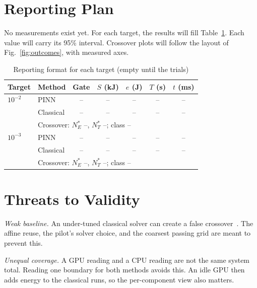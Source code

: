 \documentclass[conference]{IEEEtran}
\newcommand{\Nstar}{N^{\ast}}
\begin{document}
\section{Reporting Plan}\label{sec:report}

No measurements exist yet. For each target, the results will fill Table~\ref{tab:results}. Each value will carry its 95\% interval. Crossover plots will follow the layout of Fig.~\ref{fig:outcomes}, with measured axes.

\begin{table}[t]
\caption{Reporting format for each target (empty until the trials)}
\label{tab:results}
\centering
\footnotesize
\setlength{\tabcolsep}{2.6pt}
\begin{tabular}{@{}llccccc@{}}
\toprule
Target & Method & Gate & $S$ (kJ) & $e$ (J) & $T$ (s) & $t$ (ms) \\
\midrule
$10^{-2}$ & PINN      & -- & -- & -- & -- & -- \\
          & Classical & -- & -- & -- & -- & -- \\
          & \multicolumn{6}{l}{Crossover: $\Nstar_E$ --, $\Nstar_T$ --; class --} \\
\midrule
$10^{-3}$ & PINN      & -- & -- & -- & -- & -- \\
          & Classical & -- & -- & -- & -- & -- \\
          & \multicolumn{6}{l}{Crossover: $\Nstar_E$ --, $\Nstar_T$ --; class --} \\
\bottomrule
\end{tabular}
\end{table}

\section{Threats to Validity}\label{sec:threats}

\emph{Weak baseline.} An under-tuned classical solver can create a false crossover~\cite{mcgreivy2024}. The affine reuse, the pilot's solver choice, and the coarsest passing grid are meant to prevent this.

\emph{Unequal coverage.} A GPU reading and a CPU reading are not the same system total. Reading one boundary for both methods avoids this. An idle GPU then adds energy to the classical runs, so the per-component view also matters.
\end{document}
